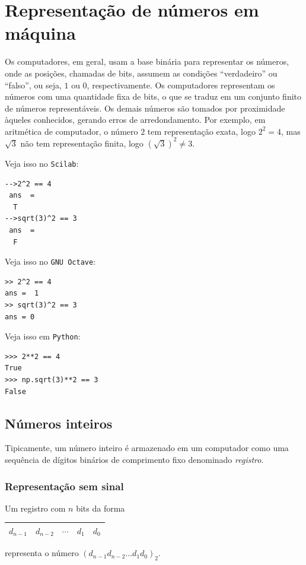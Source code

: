 \section{Representação de números em máquina}

Os computadores, em geral, usam a base binária para representar os números, onde as posições, chamadas de bits, assumem as condições ``verdadeiro'' ou ``falso'', ou seja, $1$ ou $0$, respectivamente. Os computadores representam os números com uma quantidade fixa de bits, o que se traduz em um conjunto finito de números representáveis. Os demais números são tomados por proximidade àqueles conhecidos, gerando erros de arredondamento. Por exemplo, em aritmética de computador, o número $2$ tem representação exata, logo $2^2=4$, mas $\sqrt{3}$ não tem representação finita, logo $(\sqrt{3})^2\neq 3$.

\ifisscilab
Veja isso no \verb+Scilab+:
\begin{verbatim}
-->2^2 == 4
 ans  =
  T
-->sqrt(3)^2 == 3
 ans  =
  F
\end{verbatim}
\fi
\ifisoctave
Veja isso no \verb+GNU Octave+:
\begin{verbatim}
>> 2^2 == 4
ans =  1
>> sqrt(3)^2 == 3
ans = 0
\end{verbatim}
\fi
\ifispython
Veja isso em \verb+Python+:
\begin{verbatim}
>>> 2**2 == 4
True
>>> np.sqrt(3)**2 == 3
False
\end{verbatim}
\fi

\subsection{Números inteiros}

Tipicamente, um número inteiro é armazenado em um computador como uma sequência de dígitos binários de comprimento fixo denominado \emph{registro}.

\subsubsection{Representação sem sinal}
Um registro com $n$ bits da forma
 \begin{center}
   \begin{tabular}{|c|c|c|c|c|}\hline
     $d_{n-1}$ & $d_{n-2}$ & $\cdots$ & $d_1$ & $d_0$\\\hline
   \end{tabular}
 \end{center}
representa o número $(d_{n-1}d_{n-2}...d_1d_0)_2$.

